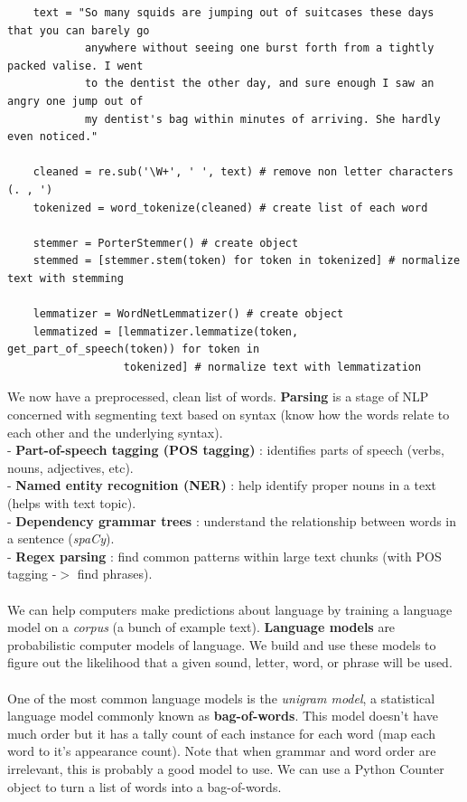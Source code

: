 \documentclass[11pt, a4paper]{article}
\begin{document}
\begin{spacing}{1.1}
\begin{lstlisting}
	text = "So many squids are jumping out of suitcases these days that you can barely go 
	        anywhere without seeing one burst forth from a tightly packed valise. I went 
	        to the dentist the other day, and sure enough I saw an angry one jump out of 
	        my dentist's bag within minutes of arriving. She hardly even noticed."
	
	cleaned = re.sub('\W+', ' ', text) # remove non letter characters (. , ') 
	tokenized = word_tokenize(cleaned) # create list of each word
	
	stemmer = PorterStemmer() # create object
	stemmed = [stemmer.stem(token) for token in tokenized] # normalize text with stemming
	
	lemmatizer = WordNetLemmatizer() # create object
	lemmatized = [lemmatizer.lemmatize(token, get_part_of_speech(token)) for token in 
	              tokenized] # normalize text with lemmatization \end{lstlisting} \vspace*{1mm}
	We now have a preprocessed, clean list of words. \textbf{Parsing} is a stage of NLP concerned with segmenting text based on syntax (know how the words relate to each other and the underlying syntax). \\
	\hspace*{2mm} - \textbf{Part-of-speech tagging (POS tagging)} : identifies parts of speech (verbs, nouns, adjectives, etc). \\
	\hspace*{2mm} - \textbf{Named entity recognition (NER)} : help identify proper nouns in a text (helps with text topic).\\
	\hspace*{2mm} - \textbf{Dependency grammar trees} : understand the relationship between words in a sentence (\textit{spaCy}). \\
	\hspace*{2mm} - \textbf{Regex parsing} : find common patterns within large text chunks (with POS tagging -$>$ find phrases). \\~\\
	We can help computers make predictions about language by training a language model on a \textit{corpus} (a bunch of example text). \textbf{Language models} are probabilistic computer models of language. We build and use these models to figure out the likelihood that a given sound, letter, word, or phrase will be used. \\~\\
	One of the most common language models is the \textit{unigram model}, a statistical language model commonly known as \textbf{bag-of-words}. This model doesn't have much order but it has a tally count of each instance for each word (map each word to it's appearance count). Note that when grammar and word order are irrelevant, this is probably a good model to use. We can use a Python Counter object to turn a list of words into a bag-of-words. \newpage
	

\end{spacing}
\end{document}

